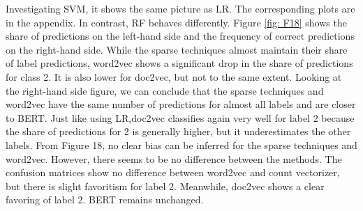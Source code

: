 \documentclass[12pt, a4paper, titlepage]{article}
\begin{document}
Investigating \ac{SVM}, it shows the same picture as \ac{LR}. The corresponding plots are in the appendix. In contrast, \ac{RF} behaves differently. Figure \ref{fig: F18} shows the share of predictions on the left-hand side and the frequency of correct predictions on the right-hand side. While the sparse techniques almost maintain their share of label predictions, word2vec shows a significant drop in the share of predictions for class 2. It is also lower for doc2vec, but not to the same extent. Looking at the right-hand side figure, we can conclude that the sparse techniques and word2vec have the same number of predictions for almost all labels and are closer to BERT. Just like using \ac{LR},doc2vec classifies again very well for label 2 because the share of predictions for 2 is generally higher, but it underestimates the other labels. From Figure 18, no clear bias can be inferred for the sparse techniques and word2vec. However, there seems to be no difference between the methods. The confusion matrices show no difference between word2vec and count vectorizer, but there is slight favoritism for label 2. Meanwhile, doc2vec shows a clear favoring of label 2. \ac{BERT} remains unchanged.
\end{document}
